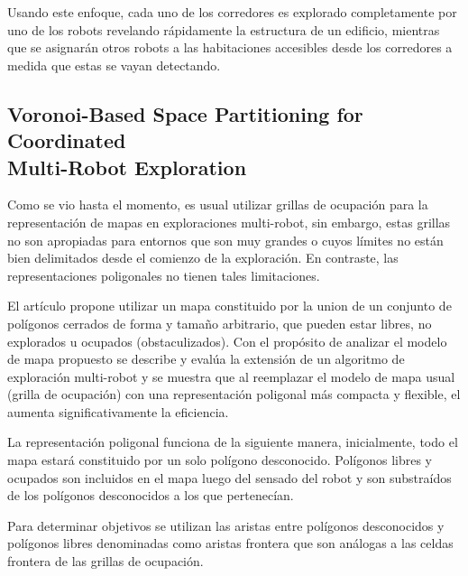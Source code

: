 Usando este enfoque, cada uno de los corredores es explorado completamente por uno de los robots revelando rápidamente la estructura de un edificio, mientras que se asignarán otros robots a las habitaciones accesibles desde los corredores a medida que estas se vayan detectando.

\subsection[Voronoi-Based Space Partitioning for Coordinated Multi-Robot Exploration]{Voronoi-Based Space Partitioning for Coordinated\\ Multi-Robot Exploration} \cite{wu2007voronoi}

Como se vio hasta el momento, es usual utilizar grillas de ocupación para la representación de mapas en exploraciones multi-robot, sin embargo, estas grillas no son apropiadas para entornos que son muy grandes o cuyos límites no están bien delimitados desde el comienzo de la exploración. En contraste, las representaciones poligonales no tienen tales limitaciones.

El artículo propone utilizar un mapa constituido por la union de un conjunto de polígonos cerrados de forma y tamaño arbitrario, que pueden estar libres, no explorados u ocupados (obstaculizados). Con el propósito de analizar el modelo de mapa propuesto se describe y evalúa la extensión de un algoritmo de exploración multi-robot y se muestra que al reemplazar el modelo de mapa usual (grilla de ocupación) con una representación poligonal más compacta y flexible, el aumenta significativamente la eficiencia.

La representación poligonal funciona de la siguiente manera, inicialmente, todo el mapa estará constituido por un solo polígono desconocido. Polígonos libres y ocupados son incluidos en el mapa luego del sensado del robot y son substraídos de los polígonos desconocidos a los que pertenecían.

Para determinar objetivos se utilizan las aristas entre polígonos desconocidos y polígonos libres denominadas como aristas frontera que son análogas a las celdas frontera de las grillas de ocupación.


